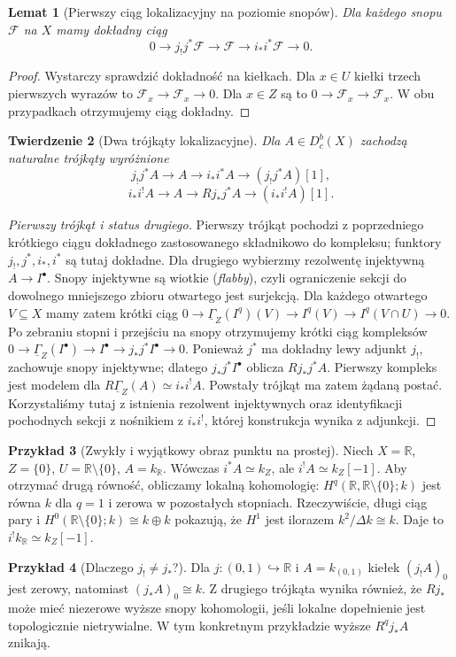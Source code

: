 \documentclass[11pt,a4paper,oneside]{report}
\newcommand{\R}{\mathbb{R}}
\theoremstyle{plain}
\newtheorem{twierdzenie}{Twierdzenie}[section]
\newtheorem{lemat}[twierdzenie]{Lemat}
\theoremstyle{definition}
\newtheorem{przyklad}[twierdzenie]{Przykład}
\theoremstyle{remark}
\begin{document}
\begin{lemat}[Pierwszy ciąg lokalizacyjny na poziomie snopów]
Dla każdego snopu $\mathcal F$ na $X$ mamy dokładny ciąg
\[
0\longrightarrow j_!j^*\mathcal F
\longrightarrow\mathcal F\longrightarrow i_*i^*\mathcal F
\longrightarrow0.
\]
\end{lemat}
\begin{proof}
Wystarczy sprawdzić dokładność na kiełkach.
Dla $x\in U$ kiełki trzech pierwszych wyrazów to
$\mathcal F_x\to\mathcal F_x\to0$.
Dla $x\in Z$ są to $0\to\mathcal F_x\to\mathcal F_x$.
W obu przypadkach otrzymujemy ciąg dokładny.
\end{proof}
\begin{twierdzenie}[Dwa trójkąty lokalizacyjne]
\label{thm:xvi-localization}
Dla $A\in D^b_c(X)$ zachodzą naturalne trójkąty wyróżnione
\[
 j_!j^*A\to A\to i_*i^*A\to (j_!j^*A)[1],
\]
\[
 i_*i^!A\to A\to Rj_*j^*A\to (i_*i^!A)[1].
\]
\end{twierdzenie}
\begin{proof}[Pierwszy trójkąt i status drugiego]
Pierwszy trójkąt pochodzi z poprzedniego krótkiego ciągu dokładnego
zastosowanego składnikowo do kompleksu; funktory $j_!,j^*,i_*,i^*$
są tutaj dokładne. Dla drugiego wybierzmy rezolwentę
injektywną $A\to I^\bullet$. Snopy injektywne są wiotkie
(\emph{flabby}), czyli ograniczenie sekcji do dowolnego
mniejszego zbioru otwartego jest surjekcją.
Dla każdego otwartego $V\subseteq X$ mamy zatem krótki ciąg
$0\to\underline\Gamma_Z(I^q)(V)
\to I^q(V)\to I^q(V\cap U)\to0$.
Po zebraniu stopni i przejściu na snopy otrzymujemy
krótki ciąg kompleksów
$0\to\underline\Gamma_Z(I^\bullet)
\to I^\bullet\to j_*j^*I^\bullet\to0$.
Ponieważ $j^*$ ma dokładny lewy adjunkt $j_!$,
zachowuje snopy injektywne; dlatego
$j_*j^*I^\bullet$ oblicza $Rj_*j^*A$.
Pierwszy kompleks jest modelem dla
$R\underline\Gamma_Z(A)\simeq i_*i^!A$.
Powstały trójkąt ma zatem żądaną postać.
Korzystaliśmy tutaj z istnienia rezolwent injektywnych
oraz identyfikacji pochodnych sekcji z nośnikiem
z $i_*i^!$, której konstrukcja wynika z adjunkcji.
\end{proof}
\begin{przyklad}[Zwykły i wyjątkowy obraz punktu na prostej]
\label{ex:xvi-point-line}
Niech $X=\R$, $Z=\{0\}$, $U=\R\setminus\{0\}$,
$A=k_{\R}$. Wówczas $i^*A\simeq k_Z$, ale
$i^!A\simeq k_Z[-1]$. Aby otrzymać drugą równość,
obliczamy lokalną kohomologię:
$H^q(\R,\R\setminus\{0\};k)$ jest równa $k$ dla $q=1$
i zerowa w pozostałych stopniach. Rzeczywiście, długi ciąg
pary i $H^0(\R\setminus\{0\};k)\cong k\oplus k$
pokazują, że $H^1$ jest ilorazem $k^2/\Delta k\cong k$.
Daje to $i^!k_{\R}\simeq k_Z[-1]$.
\end{przyklad}
\begin{przyklad}[Dlaczego $j_!\ne j_*$?]
Dla $j:(0,1)\hookrightarrow\R$ i $A=k_{(0,1)}$
kiełek $(j_!A)_0$ jest zerowy, natomiast
$(j_*A)_0\cong k$. Z drugiego trójkąta wynika również,
że $Rj_*$ może mieć niezerowe wyższe snopy kohomologii,
jeśli lokalne dopełnienie jest topologicznie nietrywialne.
W tym konkretnym przykładzie wyższe $R^qj_*A$ znikają.
\end{przyklad}
\end{document}
